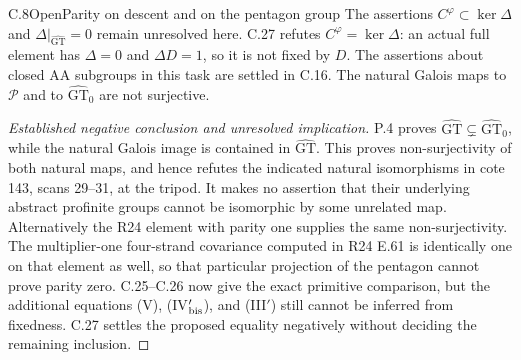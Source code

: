 \begin{statement}{C.8}{Open}{Parity on descent and on the pentagon group}
The assertions $C^\varphi\subset\ker\Delta$ and
$\Delta|_{\widehat{\mathrm{GT}}}=0$ remain unresolved here.
C.27 refutes $C^\varphi=\ker\Delta$: an actual full
element has $\Delta=0$ and $\Delta D=1$, so it is not
fixed by $D$.
The assertions about closed AA subgroups in this task are settled
in C.16. The natural Galois maps to $\mathcal P$ and to
$\widehat{\mathrm{GT}}_0$ are not surjective.
\end{statement}
\begin{proof}[Established negative conclusion and unresolved implication]
P.4 proves $\widehat{\mathrm{GT}}\subsetneq
\widehat{\mathrm{GT}}_0$, while the natural Galois image is contained
in $\widehat{\mathrm{GT}}$. This proves non-surjectivity of both
natural maps, and hence refutes the indicated natural isomorphisms
in cote 143, scans 29--31, at the tripod. It makes no assertion
that their underlying abstract profinite groups cannot be isomorphic
by some unrelated map. Alternatively the R24 element with parity
one supplies the same non-surjectivity. The multiplier-one
four-strand covariance computed in R24 E.61 is identically one on
that element as well, so that particular projection of the pentagon
cannot prove parity zero. C.25--C.26 now give the exact
primitive comparison, but the additional equations (V),
(IV$'_{\rm bis}$), and (III$'$) still cannot be inferred
from fixedness. C.27 settles the proposed equality
negatively without deciding the remaining inclusion.
\end{proof}


